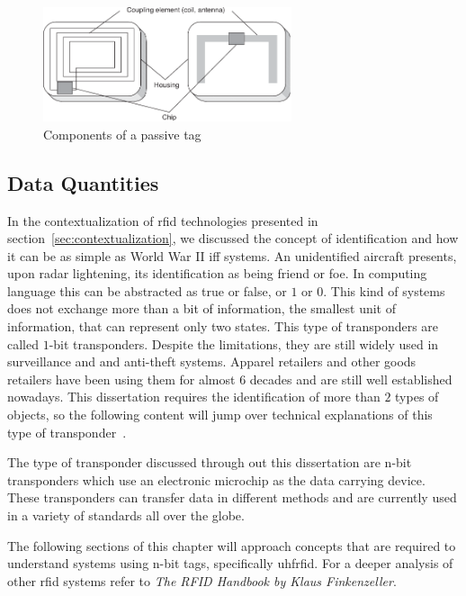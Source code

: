 \begin{figure}[!ht]
    \centering
    \includegraphics[width=0.65\textwidth]{./figs/02-state-of-the-art/tag.pdf}
    \caption{Components of a passive tag~\cite{finkenzellerRFIDHandbookFundamentals2003}} 
    \label{fig:passivetag}
\end{figure}

\subsection{Data Quantities}

In the contextualization of \ac{rfid} technologies presented in section~\ref{sec:contextualization}, we discussed the concept of identification and how it can be as simple as World War II \ac{iff} systems. 
An unidentified aircraft presents, upon radar lightening, its identification as being friend or foe. In computing language this can be abstracted as true or false, or $1$ or $0$. This kind of systems does not exchange more than a bit of information, the smallest unit of information, that can represent only two states.
This type of transponders are called $1$-bit transponders. Despite the limitations, they are still widely used in surveillance and and anti-theft systems. Apparel retailers and other goods retailers have been using them for almost $6$ decades and are still well established nowadays. 
This dissertation requires the identification of more than $2$ types of objects, so the following content will jump over technical explanations of this type of transponder~\cite{finkenzellerRFIDHandbookFundamentals2003}. 

The type of transponder discussed through out this dissertation are n-bit transponders which use an electronic microchip as the data carrying device.
These transponders can transfer data in different methods and are currently used in a variety of standards all over the globe.

The following sections of this chapter will approach concepts that are required to understand systems using n-bit tags, specifically \ac{uhfrfid}.
For a deeper analysis of other \ac{rfid} systems refer to \emph{The RFID Handbook by Klaus Finkenzeller}.


